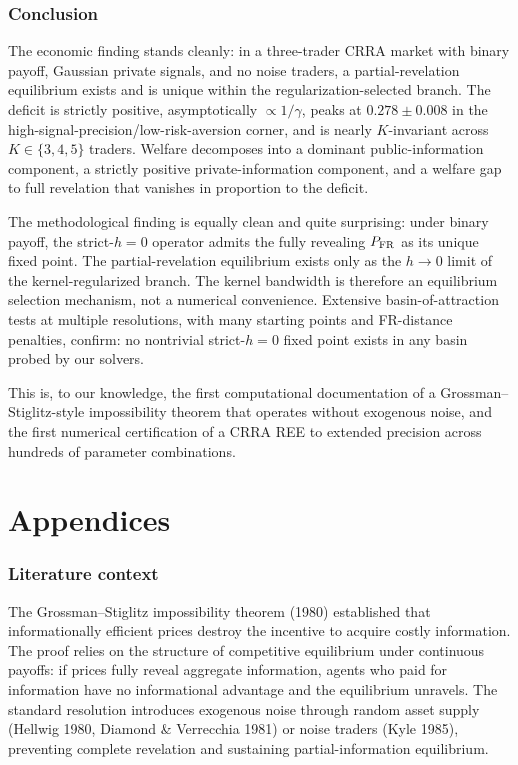 \documentclass[11pt]{article}
\newcommand{\1}{\mathbf{1}}
\newcommand{\PFR}{P_{\rm FR}}
\begin{document}
\section{Conclusion}

The economic finding stands cleanly: in a three-trader CRRA market with
binary payoff, Gaussian private signals, and no noise traders, a
partial-revelation equilibrium exists and is unique within the
regularization-selected branch.  The deficit is strictly positive,
asymptotically $\propto 1/\gamma$, peaks at $0.278 \pm 0.008$ in the
high-signal-precision/low-risk-aversion corner, and is nearly
$K$-invariant across $K \in \{3, 4, 5\}$ traders.  Welfare decomposes
into a dominant public-information component, a strictly positive
private-information component, and a welfare gap to full revelation
that vanishes in proportion to the deficit.

The methodological finding is equally clean and quite surprising:
under binary payoff, the strict-$h=0$ operator admits the fully
revealing $\PFR$ as its unique fixed point.  The partial-revelation
equilibrium exists only as the $h \to 0$ limit of the
kernel-regularized branch.  The kernel bandwidth is therefore an
equilibrium selection mechanism, not a numerical convenience.
Extensive basin-of-attraction tests at multiple resolutions, with
many starting points and FR-distance penalties, confirm: no
nontrivial strict-$h=0$ fixed point exists in any basin probed by our
solvers.

This is, to our knowledge, the first computational documentation of a
Grossman--Stiglitz-style impossibility theorem that operates without
exogenous noise, and the first numerical certification of a CRRA REE
to extended precision across hundreds of parameter combinations.


\appendix
\part{Appendices}


\section{Literature context}
\label{app:lit}

The Grossman--Stiglitz impossibility theorem (1980) established that
informationally efficient prices destroy the incentive to acquire costly
information.  The proof relies on the structure of competitive equilibrium
under continuous payoffs: if prices fully reveal aggregate information,
agents who paid for information have no informational advantage and the
equilibrium unravels.  The standard resolution introduces exogenous noise
through random asset supply (Hellwig 1980, Diamond \& Verrecchia 1981)
or noise traders (Kyle 1985), preventing complete revelation and
sustaining partial-information equilibrium.
\end{document}
